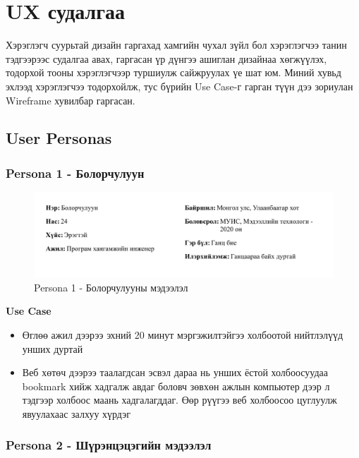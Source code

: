 \section{UX судалгаа}

Хэрэглэгч суурьтай дизайн гаргахад хамгийн чухал зүйл бол хэрэглэгчээ танин тэдгээрээс судалгаа авах, гаргасан үр дүнгээ ашиглан дизайнаа хөгжүүлэх, тодорхой тооны хэрэглэгчээр туршиулж сайжруулах үе шат юм. Миний хувьд эхлээд хэрэглэгчээ тодорхойлж, тус бүрийн Use Case-г гарган түүн дээ зориулан Wireframe хувилбар гаргасан. 

\subsection{User Personas}

\subsubsection{Persona 1 - Болорчулуун}

\begin{figure}[h]
	\centering
	\includegraphics[width=15cm]{images/persona1-bolorchuluun.png}
	\caption{Persona 1 - Болорчулууны мэдээлэл}
	\label{fig:persona1}
\end{figure}

\textbf{Use Case}

\begin{itemize}
	\item Өглөө ажил дээрээ эхний 20 минут мэргэжилтэйгээ холбоотой нийтлэлүүд унших дуртай
	\item Веб хөтөч дээрээ таалагдсан эсвэл дараа нь унших ёстой холбоосуудаа bookmark хийж хадгалж авдаг боловч зөвхөн ажлын компьютер дээр л тэдгээр холбоос маань хадгалагддаг. Өөр рүүгээ веб холбоосоо цуглуулж явуулахаас залхуу хүрдэг
\end{itemize}

\subsubsection{Persona 2 - Шүрэнцэцэгийн мэдээлэл}

